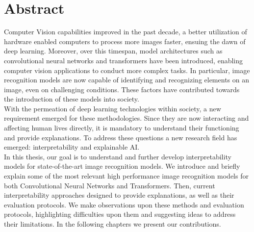 \chapter*{Abstract}
Computer Vision capabilities improved in the past decade, a better utilization of hardware enabled 
computers to process more images faster, ensuing the dawn of deep learning. Moreover, over this 
timespan, model architectures such as convolutional neural networks and transformers have been 
introduced, enabling computer vision applications to conduct more complex tasks. In particular, 
image recognition models are now capable of identifying and recognizing elements on an image, even 
on challenging conditions. These factors have contributed towards the introduction of these models 
into society.\\

\noindent With the permeation of deep learning technologies within society, a new requirement 
emerged for these methodologies. Since they are now interacting and affecting human lives directly, 
it is mandatory to understand their functioning and provide explanations. To address these 
questions a new research field has emerged: interpretability and explainable AI.\\

\noindent In this thesis, our goal is to understand and further develop interpretability models for 
state-of-the-art image recognition models. We introduce and briefly explain some of the most 
relevant high performance image recognition models for both Convolutional Neural Networks 
and Transformers. Then, current interpretability approaches designed to provide 
explanations, as well as their evaluation protocols. We make observations upon 
these methods and evaluation protocols, highlighting difficulties upon them and suggesting ideas 
to address their limitations. In the following chapters we present our contributions. \\

